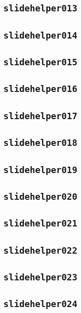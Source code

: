 \subsection{\texttt{slidehelper013}}
\newpage
\subsection{\texttt{slidehelper014}}
\newpage
\subsection{\texttt{slidehelper015}}
\newpage
\subsection{\texttt{slidehelper016}}
\newpage
\subsection{\texttt{slidehelper017}}
\newpage
\subsection{\texttt{slidehelper018}}
\newpage
\subsection{\texttt{slidehelper019}}
\newpage
\subsection{\texttt{slidehelper020}}
\newpage
\subsection{\texttt{slidehelper021}}
\newpage
\subsection{\texttt{slidehelper022}}
\newpage
\subsection{\texttt{slidehelper023}}
\newpage
\subsection{\texttt{slidehelper024}}
\newpage
